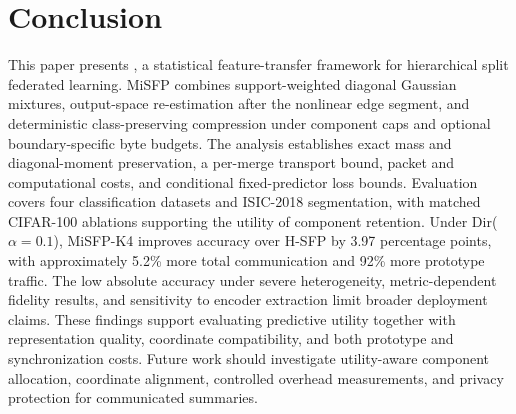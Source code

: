 \section{Conclusion}
\label{sec:conclusion}

This paper presents \method{}, a statistical feature-transfer framework for hierarchical split federated learning. MiSFP combines support-weighted diagonal Gaussian mixtures, output-space re-estimation after the nonlinear edge segment, and deterministic class-preserving compression under component caps and optional boundary-specific byte budgets. The analysis establishes exact mass and diagonal-moment preservation, a per-merge transport bound, packet and computational costs, and conditional fixed-predictor loss bounds. Evaluation covers four classification datasets and ISIC-2018 segmentation, with matched CIFAR-100 ablations supporting the utility of component retention. Under Dir($\alpha=0.1$), MiSFP-K4 improves accuracy over H-SFP by 3.97 percentage points, with approximately 5.2\% more total communication and 92\% more prototype traffic. The low absolute accuracy under severe heterogeneity, metric-dependent fidelity results, and sensitivity to encoder extraction limit broader deployment claims. These findings support evaluating predictive utility together with representation quality, coordinate compatibility, and both prototype and synchronization costs. Future work should investigate utility-aware component allocation, coordinate alignment, controlled overhead measurements, and privacy protection for communicated summaries.